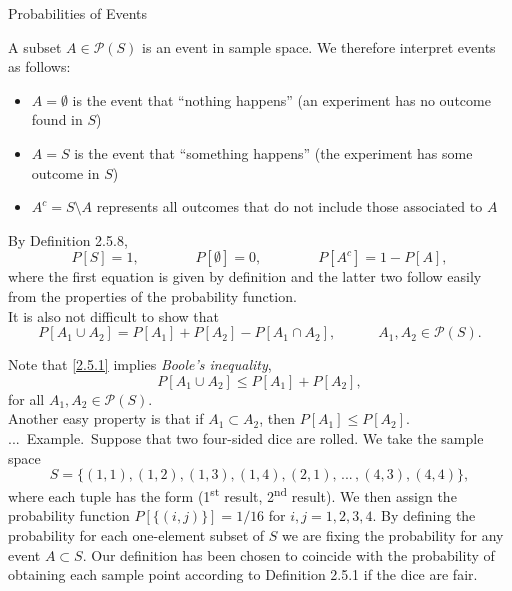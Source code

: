 \documentclass[smaller,hyperref={CJKbookmarks=true}]{beamer}
\newcounter{zhuo}[subsection]
\renewcommand{\thezhuo}{\thesection.\thesubsection.\arabic{zhuo}}
\newenvironment{EXAMPLE}{\stepcounter{zhuo}\alert{\!\thezhuo.~Example.\,}}{}
\begin{document}
\begin{frame}{Probabilities of Events}
\begin{spacing}{0.9}
A subset $A\in\mathcal{P}(S)$ is an event in sample space. We therefore interpret events as follows:
\begin{itemize}
  \item $A=\emptyset$ is the event that ``nothing happens'' (an experiment has no outcome found in $S$)
  \item $A=S$ is the event that ``something happens'' (the experiment has some outcome in $S$)
  \item $A^c=S\setminus A$ represents all outcomes that do not include those associated to $A$
\end{itemize}
By Definition 2.5.8,
\[P[S]=1,\qquad\qquad P[\emptyset]=0,\qquad\qquad
P[A^c]=1-P[A],\]
where the first equation is given by definition and the latter two follow
easily from the properties of the probability function.\\[5pt]
It is also not difficult to show that
\setcounter{equation}{0}
\begin{equation}\label{2.5.1}
P[A_1\cup A_2]=P[A_1]+P[A_2]-P[A_1\cap A_2],\qquad\quad A_1,A_2\in\mathcal{P}(S).
\end{equation}
\end{spacing}
\newpage
\begin{spacing}{1.1}
Note that \eqref{2.5.1} implies \emph{Boole's inequality},
\begin{equation}\label{2.5.2}
P[A_1\cup A_2]\leq P[A_1]+P[A_2],
\end{equation}
for all $A_1,A_2\in\mathcal{P}(S)$.\\[5pt]
Another easy property is that if $A_1\subset A_2$, then $P[A_1]\leq P[A_2]$.\\[5pt]
\begin{EXAMPLE}
Suppose that two four-sided dice are rolled. We take the sample space
\[S=\{(1,1),(1,2),(1,3),(1,4),(2,1),\,...\,,(4,3),(4,4)\},\]
where each tuple has the form (1\textsuperscript{st} result, 2\textsuperscript{nd} result). We then assign the probability function $P[\{(i,j)\}]=1/16$ for $i,j=1,2,3,4$. By defining the probability for each one-element subset of $S$ we are fixing the probability for any event $A\subset S$. Our definition has been chosen to coincide with the
probability of obtaining each sample point according to Definition 2.5.1 if
the dice are fair.
\end{EXAMPLE}
\end{spacing}

\end{frame}
\end{document}
